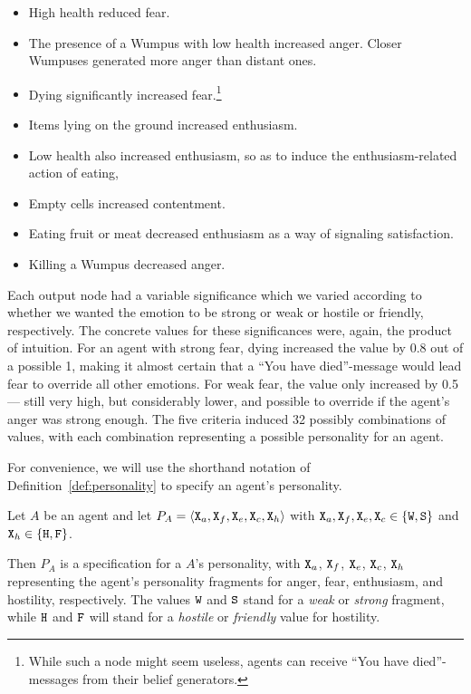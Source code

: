 \begin{itemize}
	\item High health reduced fear.
	\item The presence of a Wumpus with low health increased anger. Closer Wumpuses generated more anger than distant ones.
	\item Dying significantly increased fear.\footnote{While such a node might seem useless, agents can receive ``You have died''-messages from their belief generators.}
	\item Items lying on the ground increased enthusiasm.
	\item Low health also increased enthusiasm, so as to induce the enthusiasm-related action of eating,
	\item Empty cells increased contentment.
	\item Eating fruit or meat decreased enthusiasm as a way of signaling satisfaction.
	\item Killing a Wumpus decreased anger.
\end{itemize}

Each output node had a variable significance which we varied according to whether we wanted the emotion to be strong or weak or hostile or friendly, respectively. The concrete values for these significances were, again, the product of intuition. For an agent with strong fear, dying increased the value by 0.8 out of a possible 1, making it almost certain that a ``You have died''-message would lead fear to override all other emotions. For weak fear, the value only increased by 0.5 --- still very high, but considerably lower, and possible to override if the agent's anger was strong enough. The five criteria induced 32 possibly combinations of values, with each combination representing a possible personality for an agent.

For convenience, we will use the shorthand notation of Definition~\ref{def:personality} to specify an agent's personality.

\begin{definition}\label{def:personality}
   Let $A$ be an agent and let $P_A = \langle \mathtt{X}_a, \mathtt{X}_f, \mathtt{X}_e, \mathtt{X}_c, \mathtt{X}_h \rangle$ with $\mathtt{X}_a, \mathtt{X}_f, \mathtt{X}_e, \mathtt{X}_c \in \{ \mathtt{W}, \mathtt{S} \}$ and $\mathtt{X}_h \in \{ \mathtt{H}, \mathtt{F} \}$.
   
   Then $P_A$ is a specification for a $A$'s personality, with $\mathtt{X}_a$, $\mathtt{X}_f$, $\mathtt{X}_e$, $\mathtt{X}_c$, $\mathtt{X}_h$ representing the agent's personality fragments for anger, fear, enthusiasm, and hostility, respectively. The values $\mathtt{W}$ and $\mathtt{S}$ stand for a \emph{weak} or \emph{strong} fragment, while $\mathtt{H}$ and $\mathtt{F}$ will stand for a \emph{hostile} or \emph{friendly} value for hostility.
\end{definition}

